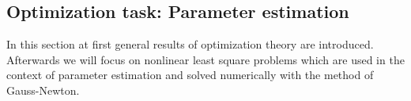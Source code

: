 \documentclass{scrartcl}[12pt, halfparskip]
\numberwithin{equation}{section}
\numberwithin{figure}{section}
\numberwithin{table}{section}
\begin{document}
%
%
%
%
%
%
%
%
%
%
%




\subsection{Optimization task: Parameter estimation}

In this section at first general results of optimization theory are introduced. Afterwards we will focus on nonlinear least square problems which are used in the context of parameter estimation and solved numerically with the method of Gauss-Newton.
\end{document}
